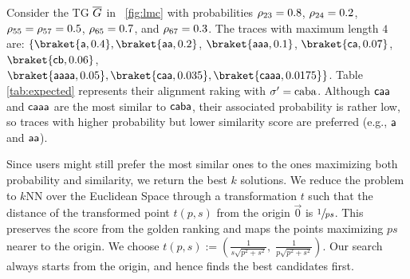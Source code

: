 \begin{table}[!t]
	\vspace{5mm}
\centering
\caption{Golden ranking of $\ptraces{\closed{\tg}}{0}$ with maximum length $4$, where $\logtrace=\const{caba}$ and $c=5$.}\label{tab:expected}
\end{table}
\begin{example}\label{ex:rankingTaus}
Consider the TG $\overline{G}$ in \figurename~\ref{fig:lmc} with probabilities
$\rho_{23}=0.8$, $\rho_{24}=0.2$, $\rho_{55}=\rho_{57}=0.5$, $\rho_{65}=0.7$, and $\rho_{67}=0.3$. The traces with maximum length $4$ are:
$\{\braket{\const{a},0.4},\braket{\const{aa},0.2}$, $\braket{\const{aaa},0.1}$, $\braket{\const{ca},0.07}$, 
$\braket{\const{cb},0.06}$,
$\braket{\const{aaaa},0.05},\braket{\const{caa},0.035},\braket{\const{caaa},0.0175}\}$. 
Table \ref{tab:expected} represents their alignment raking with  ${\sigma'}=\textup{caba}$.  Although $\mathsf{caa}$ and 
$\mathsf{caaa}$ are the most similar to $\mathsf{caba}$, their associated probability  is rather low, so traces with 
higher probability but lower similarity score are preferred (e.g., $\mathsf{a}$ and $\mathsf{aa}$).
\end{example}
%
{Since users might still prefer the most similar ones to the ones maximizing both probability and similarity, we 
return the best $k$ solutions.
We reduce the problem to $k$NN over the Euclidean Space through a transformation $t$ such that the distance of the 
transformed point $t(p,s)$ from  the origin $\vec{0}$ is $\sfrac{1}{ps}$. This preserves the score from the golden ranking 
and maps the points maximizing $ps$ nearer to the origin. We choose}
$t(p,s):=\left(\frac{1}{s\sqrt{p^2+s^2}},\; \frac{1}{p\sqrt{p^2+s^2}}\right)$. 
Our search always starts from the origin, and hence finds the best candidates first.
	
